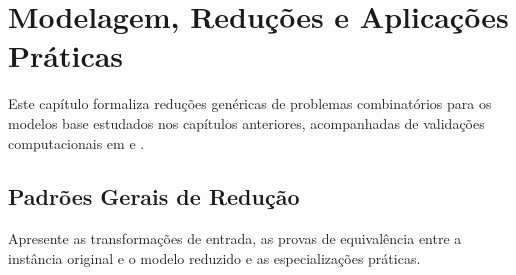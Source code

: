 \chapter{Modelagem, Reduções e Aplicações Práticas}\label{sec:modelagem_aplicacoes}

Este capítulo formaliza reduções genéricas de problemas combinatórios para os modelos base estudados nos capítulos anteriores, acompanhadas de validações computacionais em  e .

\section{Padrões Gerais de Redução}

Apresente as transformações de entrada, as provas de equivalência entre a instância original e o modelo reduzido e as especializações práticas.
